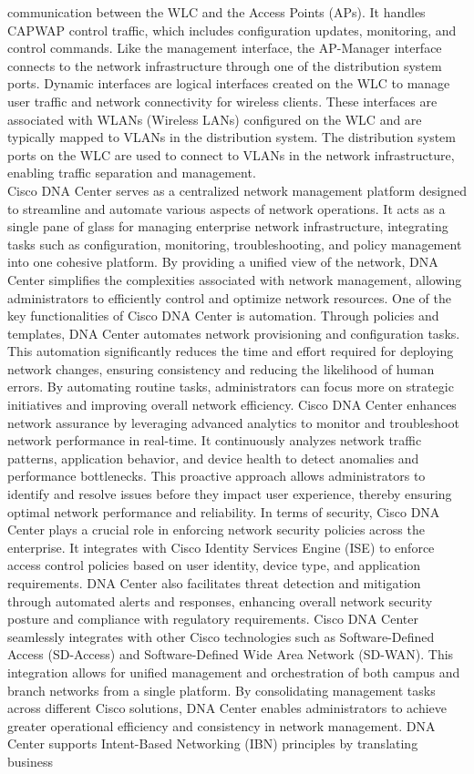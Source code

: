 \documentclass{article}
\begin{document}
communication between the WLC and the Access Points (APs). It handles CAPWAP control traffic, which includes configuration updates, monitoring, and control commands. Like the management interface, the AP-Manager interface connects to the network infrastructure through one of the distribution system ports. Dynamic interfaces are logical interfaces created on the WLC to manage user traffic and network connectivity for wireless clients. These interfaces are associated with WLANs (Wireless LANs) configured on the WLC and are typically mapped to VLANs in the distribution system. The distribution system ports on the WLC are used to connect to VLANs in the network infrastructure, enabling traffic separation and management.\\

	Cisco DNA Center serves as a centralized network management platform designed to streamline and automate various aspects of network operations. It acts as a single pane of glass for managing enterprise network infrastructure, integrating tasks such as configuration, monitoring, troubleshooting, and policy management into one cohesive platform. By providing a unified view of the network, DNA Center simplifies the complexities associated with network management, allowing administrators to efficiently control and optimize network resources. One of the key functionalities of Cisco DNA Center is automation. Through policies and templates, DNA Center automates network provisioning and configuration tasks. This automation significantly reduces the time and effort required for deploying network changes, ensuring consistency and reducing the likelihood of human errors. By automating routine tasks, administrators can focus more on strategic initiatives and improving overall network efficiency. Cisco DNA Center enhances network assurance by leveraging advanced analytics to monitor and troubleshoot network performance in real-time. It continuously analyzes network traffic patterns, application behavior, and device health to detect anomalies and performance bottlenecks. This proactive approach allows administrators to identify and resolve issues before they impact user experience, thereby ensuring optimal network performance and reliability. In terms of security, Cisco DNA Center plays a crucial role in enforcing network security policies across the enterprise. It integrates with Cisco Identity Services Engine (ISE) to enforce access control policies based on user identity, device type, and application requirements. DNA Center also facilitates threat detection and mitigation through automated alerts and responses, enhancing overall network security posture and compliance with regulatory requirements. Cisco DNA Center seamlessly integrates with other Cisco technologies such as Software-Defined Access (SD-Access) and Software-Defined Wide Area Network (SD-WAN). This integration allows for unified management and orchestration of both campus and branch networks from a single platform. By consolidating management tasks across different Cisco solutions, DNA Center enables administrators to achieve greater operational efficiency and consistency in network management. DNA Center supports Intent-Based Networking (IBN) principles by translating business 
\end{document}
